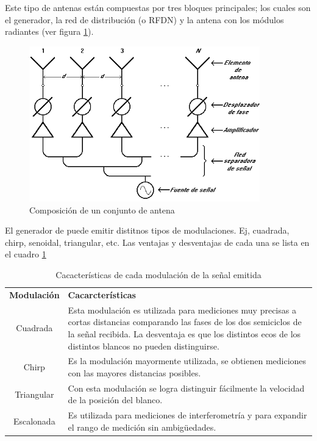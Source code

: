 Este tipo de antenas están compuestas por tres bloques principales; los cuales son el generador, la red de distribución (o RFDN) y la
antena con los módulos radiantes (ver figura \ref{fig:compositionAntenna}).

\begin{figure}[H]
 \centering
 \includegraphics[width=10cm]{gfx/CompositionAntenna.png}
 \caption{Composición de un conjunto de antena}
 \label{fig:compositionAntenna}
\end{figure}

El generador de puede emitir distitnos tipos de modulaciones. Ej, cuadrada, chirp, senoidal, triangular, etc. Las ventajas y
desventajas de cada una se lista en el cuadro \ref{tab:modulations}

\begin{table}[H]
  \footnotesize
  \centering
  \begin{tabular}{|c|p{9cm}|}
	\hline
	\textbf{Modulación} & \textbf{Cacarcterísticas} \\
	Cuadrada & Esta modulación es utilizada para mediciones muy precisas a cortas distancias comparando las fases de los dos
	semiciclos de la señal recibida. La desventaja es que los distintos ecos de los distintos blancos no pueden distinguirse.\\\hline
	Chirp & Es la modulación mayormente utilizada, se obtienen mediciones con las mayores distancias posibles.\\\hline
	Triangular & Con esta modulación se logra distinguir fácilmente la velocidad de la posición del blanco. \\\hline
	Escalonada & Es utilizada para mediciones de interferometría y para expandir el rango de medición sin ambig\"uedades.\\\hline
  \end{tabular}
  \caption{Cacacterísticas de cada modulación de la señal emitida}
  \label{tab:modulations}
\end{table}

